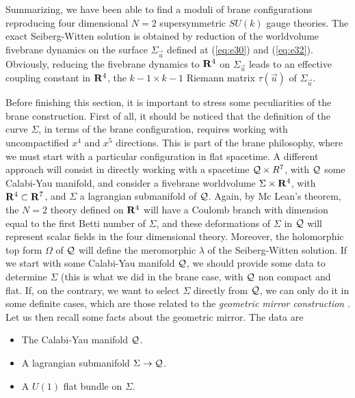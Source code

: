 Summarizing, we have been able to find a moduli of brane
configurations reproducing four dimensional $N=2$ supersymmetric
$SU(k)$ gauge theories. The exact Seiberg-Witten solution is
obtained by reduction of the worldvolume fivebrane dynamics on
the surface $\Sigma_{\vec{u}}$ defined at (\ref{eq:e30}) and
(\ref{eq:e32}). Obviously, reducing the fivebrane dynamics to
${\bf R}^4$ on $\Sigma_{\vec{u}}$ leads to an effective coupling constant
in ${\bf R}^4$, the $k-1 \times k-1$ Riemann matrix $\tau(\vec{u})$ of
$\Sigma_{\vec{u}}$.
  
\vspace{2 mm}
  

Before finishing this section, it is important to stress some
peculiarities of the brane construction. First of all, it should
be noticed that the definition of the curve $\Sigma$, in terms of
the brane configuration, requires working with uncompactified
$x^4$ and $x^5$ directions. This is part of the brane philosophy,
where we must start with a particular configuration in flat
spacetime. A different approach will consist in directly working
with a spacetime ${\cal Q} \times R^7$, with ${\cal Q}$ some
Calabi-Yau manifold, and consider a fivebrane worldvolume $\Sigma
\times {\bf R}^4$, with ${\bf R}^4 \subset {\bf R}^7$, and
$\Sigma$ a lagrangian submanifold of ${\cal Q}$. Again, by Mc
Lean's theorem, the $N=2$ theory defined on ${\bf R}^4$ will
have a Coulomb branch with dimension equal to the first Betti
number of $\Sigma$, and these deformations of $\Sigma$ in ${\cal
Q}$ will represent scalar fields in the four dimensional theory.
Moreover, the holomorphic top form $\Omega$ of ${\cal Q}$ will
define the meromorphic $\lambda$ of the Seiberg-Witten solution.
If we start with some Calabi-Yau manifold ${\cal Q}$, we should
provide some data to determine $\Sigma$ (this is what we did in
the brane case, with ${\cal Q}$ non compact and flat. If, on the
contrary, we want to select $\Sigma$ directly from ${\cal Q}$, we
can only do it in some definite cases, which are those related to
the {\em geometric mirror construction} \cite{SYZ,Mor}. Let us then recall some
facts about the geometric mirror. The data are
\begin{itemize}
	\item The Calabi-Yau manifold ${\cal Q}$.
	\item A lagrangian submanifold $\Sigma \rightarrow {\cal
Q}$.
	\item A $U(1)$ flat bundle on $\Sigma$.
\end{itemize}
  
